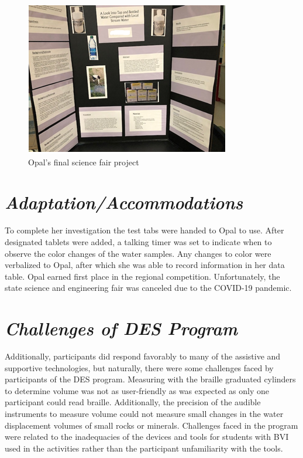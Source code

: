 \documentclass[11.5pt]{sig-alternate}
\begin{document}
\begin{large}
\begin{figure}[h] 
  \renewcommand{\thefigure}{11}
    \centering
    \includegraphics[width=\columnwidth]{figure11.png}
    \caption{Opal’s final science fair project}
    \label{Opal’s final science fair project}
\end{figure}

\section*{\textit{Adaptation/Accommodations}} 
To complete her investigation the test tabs were handed to Opal to use. After designated tablets were added, a talking timer was set to indicate when to observe the color changes of the water samples.  Any changes to color were verbalized to Opal, after which she was able to record information in her data table. Opal earned first place in the regional competition. Unfortunately, the state science and engineering fair was canceled due to the COVID-19 pandemic.

\section*{\textit{Challenges of DES Program}}
Additionally, participants did respond favorably to many of the assistive and supportive technologies, but naturally, there were some challenges faced by participants of the DES program. Measuring with the braille graduated cylinders to determine volume was not as user-friendly as was expected as only one participant could read braille. Additionally, the precision of the audible instruments to measure volume could not measure small changes in the water displacement volumes of small rocks or minerals. Challenges faced in the program were related to the inadequacies of the devices and tools for students with BVI used in the activities rather than the participant unfamiliarity with the tools.


\end{large}
\end{document}
